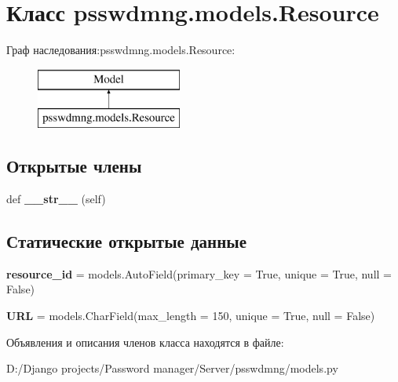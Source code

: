 \section{Класс psswdmng.\+models.\+Resource}
\label{classpsswdmng_1_1models_1_1_resource}
Граф наследования\+:psswdmng.\+models.\+Resource\+:\begin{figure}[H]
\begin{center}
\leavevmode
\includegraphics[height=2.000000cm]{classpsswdmng_1_1models_1_1_resource}
\end{center}
\end{figure}
\subsection*{Открытые члены}
\begin{DoxyCompactItemize}
\item 
\mbox{\label{classpsswdmng_1_1models_1_1_resource_a5501670c1cda9492cf8509e0e0614686}} 
def {\bfseries \+\_\+\+\_\+str\+\_\+\+\_\+} (self)
\end{DoxyCompactItemize}
\subsection*{Статические открытые данные}
\begin{DoxyCompactItemize}
\item 
\mbox{\label{classpsswdmng_1_1models_1_1_resource_a9ea356e4cf06a67aa248a55302ec28db}} 
{\bfseries resource\+\_\+id} = models.\+Auto\+Field(primary\+\_\+key = True, unique = True, null = False)
\item 
\mbox{\label{classpsswdmng_1_1models_1_1_resource_ae31ca11515c63ffa9b27bab6f5e90d50}} 
{\bfseries U\+RL} = models.\+Char\+Field(max\+\_\+length = 150, unique = True, null = False)
\end{DoxyCompactItemize}


Объявления и описания членов класса находятся в файле\+:\begin{DoxyCompactItemize}
\item 
D\+:/\+Django projects/\+Password manager/\+Server/psswdmng/models.\+py\end{DoxyCompactItemize}

